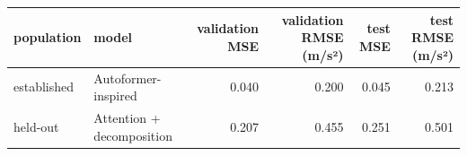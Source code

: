 \begin{tabular}{llrrrr}
\toprule
population & model & validation MSE & validation RMSE (m/s²) & test MSE & test RMSE (m/s²) \\
\midrule
established & Autoformer-inspired & 0.040 & 0.200 & 0.045 & 0.213 \\
held-out & Attention + decomposition & 0.207 & 0.455 & 0.251 & 0.501 \\
\bottomrule
\end{tabular}
